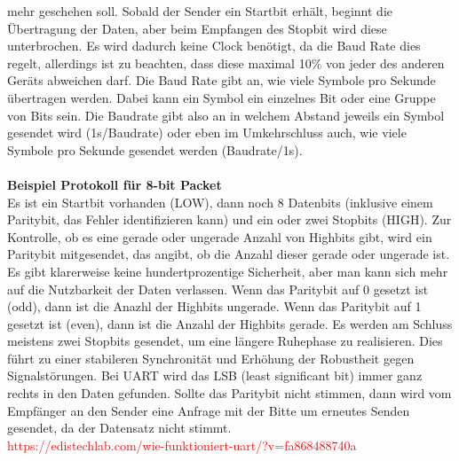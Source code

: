 \documentclass[titlepage,12pt,twoside]{article}
\begin{document}
mehr geschehen soll. Sobald der Sender ein Startbit erhält, beginnt die Übertragung 
der Daten, aber beim Empfangen des Stopbit wird diese unterbrochen. Es wird 
dadurch keine Clock benötigt, da die Baud Rate dies regelt, allerdings ist zu 
beachten, dass diese maximal 10\% von jeder des anderen Geräts abweichen darf. 
Die Baud Rate gibt an, wie viele Symbole pro Sekunde übertragen werden. Dabei 
kann ein Symbol ein einzelnes Bit oder eine Gruppe von Bits sein. Die Baudrate 
gibt also an in welchem Abstand jeweils ein Symbol gesendet wird (1s/Baudrate) 
oder eben im Umkehrschluss auch, wie viele Symbole pro Sekunde gesendet werden 
(Baudrate/1s). \\
\\
\textbf{Beispiel Protokoll für 8-bit Packet} \\
Es ist ein Startbit vorhanden (LOW), dann noch 8 Datenbits (inklusive einem 
Paritybit, das Fehler identifizieren kann) und ein oder zwei Stopbits (HIGH). 
Zur Kontrolle, ob es eine gerade oder ungerade Anzahl von Highbits gibt, wird 
ein Paritybit mitgesendet, das angibt, ob die Anzahl dieser gerade oder ungerade 
ist. Es gibt klarerweise keine hundertprozentige Sicherheit, aber man kann sich 
mehr auf die Nutzbarkeit der Daten verlassen. Wenn das Paritybit auf 0 gesetzt 
ist (odd), dann ist die Anazhl der Highbits ungerade. Wenn das Paritybit auf 1 
gesetzt ist (even), dann ist die Anzahl der Highbits gerade. Es werden am 
Schluss meistens zwei Stopbits gesendet, um eine längere Ruhephase zu realisieren. 
Dies führt zu einer stabileren Synchronität und Erhöhung der Robustheit gegen 
Signalstörungen. Bei UART wird das LSB (least significant bit) immer ganz rechts 
in den Daten gefunden. Sollte das Paritybit nicht stimmen, dann wird vom 
Empfänger an den Sender eine Anfrage mit der Bitte um erneutes Senden gesendet, 
da der Datensatz nicht stimmt. \\

\textcolor{red}{https://edistechlab.com/wie-funktioniert-uart/?v=fa868488740a}
\end{document}
